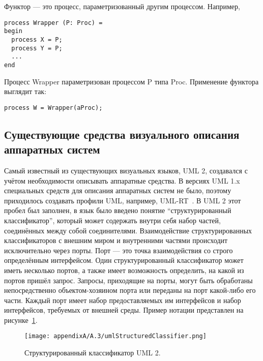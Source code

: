 Функтор --- это процесс, параметризованный другим процессом. Например,

\vspace{5mm}
\begin{minipage}{\linewidth}
\begin{verbatim}
process Wrapper (P: Proc) =
begin
  process X = P;
  process Y = P;
  ...
end
\end{verbatim}
\end{minipage}
\vspace{5mm}

Процесс Wrapper параметризован процессом P типа Proc. Применение функтора выглядит так:
\begin{verbatim}
process W = Wrapper(aProc);
\end{verbatim}

\subsection{Существующие средства визуального описания аппаратных систем}
Самый известный из существующих визуальных языков, UML 2, создавался с учётом необходимости 
описывать аппаратные средства. В версиях UML 1.x специальных средств для описания 
аппаратных систем не было, поэтому приходилось создавать профили UML, например, UML-RT~\cite{selic1998using}.
В UML 2 этот пробел был заполнен, в язык было введено понятие "`структурированный классификатор"', 
который может содержать внутри себя набор частей, соединённых между собой соединителями. 
Взаимодействие структурированных классификаторов с внешним миром и внутренними частями 
происходит исключительно через порты. Порт --- это точка взаимодействия со строго 
определённым интерфейсом. Один структурированный классификатор может иметь несколько 
портов, а также имеет возможность определить, на какой из портов пришёл запрос. Запросы, 
приходящие на порты, могут быть обработаны непосредственно объектом-хозяином порта 
или переданы на порт какой-либо его части. Каждый порт имеет набор предоставляемых 
им интерфейсов и набор интерфейсов, требуемых от внешней среды. Пример нотации представлен 
на рисунке~\ref{image:umlStructuredClassifier}.

\begin{figure} [ht]
	\begin{center}
		\texttt{[image: appendixA/A.3/umlStructuredClassifier.png]}
		\caption{Структурированный классификатор UML 2.}
		\label{image:umlStructuredClassifier}
	\end{center}
\end{figure}

